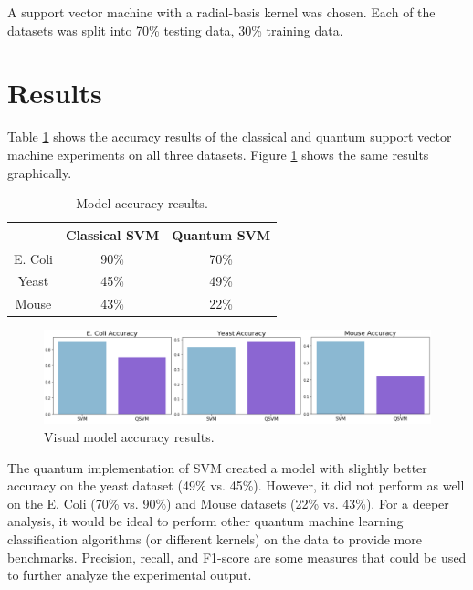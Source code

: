 \documentclass{article}
\begin{document}
  A support vector machine with a radial-basis kernel was chosen. Each of the datasets was split into 70\% testing data, 30\% training data. \\

\section{Results}
    Table \ref{table:accuracy} shows the accuracy results of the classical and quantum support vector machine experiments on all three datasets. Figure \ref{fig:results} shows the same results graphically. \\

    \begin{table}[h]
      \centering
      \begin{tabular}{c|c|c|}
      \cline{2-3}
                                    & Classical SVM & Quantum SVM \\ \hline
      \multicolumn{1}{|c|}{E. Coli} & 90\%          & 70\%        \\ \hline
      \multicolumn{1}{|c|}{Yeast}   & 45\%          & 49\%        \\ \hline
      \multicolumn{1}{|c|}{Mouse}   & 43\%          & 22\%        \\ \hline
      \end{tabular}
      \caption{\label{table:accuracy}Model accuracy results.}
    \end{table}

    \hfill \break

    \begin{figure}[h]
      \centering
      \includegraphics[width=1\textwidth]{accuracy.png}
      \caption{\label{fig:results}Visual model accuracy results.}
    \end{figure}

    The quantum implementation of SVM created a model with slightly better accuracy on the yeast dataset (49\% vs. 45\%). However, it did not perform as well on the E. Coli (70\% vs. 90\%) and Mouse datasets (22\% vs. 43\%). For a deeper analysis, it would be ideal to perform other quantum machine learning classification algorithms (or different kernels) on the data to provide more benchmarks. Precision, recall, and F1-score are some measures that could be used to further analyze the experimental output. \\
\end{document}
